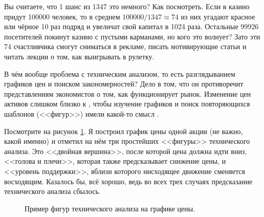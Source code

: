Вы считаете, что 1 шанс из 1347 это немного? Как посмотреть. Если в казино 
придут \num{100000} человек, то в среднем $\num{100000}/1347 \approx 74$ из них 
угадают красное или чёрное 10 раз подряд и увеличат свой капитал в \num{1024} 
раза. Остальные \num{99926} посетителей покинут казино с пустыми карманами, но 
кого это волнует? Зато эти 74 счастливчика смогут сниматься в рекламе, писать 
мотивирующие статьи и читать лекции о том, как выигрывать в рулетку.

В чём вообще проблема с техническим анализом, то есть разглядыванием графиков
цен и поиском закономерностей? Дело в том, что он противоречит представлениям
экономистов о том, как функционирует рынок. Изменение цен активов слишком близко 
к , чтобы изучение графиков и поиск 
повторяющихся шаблонов (<<фигур>>) имели какой-то смысл \cite[ch.~11.2]
{bodie2014investments}.

Посмотрите на рисунок \ref{tech_analysis_example}. Я построил график цены одной 
акции (не важно, какой именно) и отметил на нём три простейших <<фигуры>> 
технического анализа. Это <<двойная вершина>>, после которой цена должна идти 
вниз, <<голова и плечи>>, которая также предсказывает снижение цены, и <<уровень 
поддержки>>, вблизи которого нисходящее движение сменяется восходящим. Казалось 
бы, всё хорошо, ведь во всех трех случаях предсказание технического анализа 
сбылось.

\begin{figure}[ht]
\centering
{}
\caption{Пример фигур технического анализа на графике цены.}
\label{tech_analysis_example}
\end{figure}


